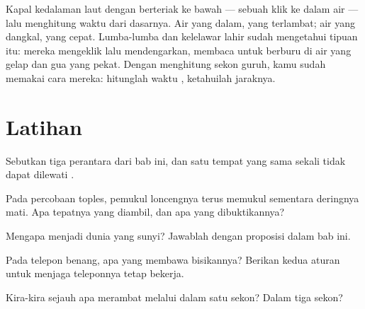 \begin{remark}\label{rem:g4:how-sound-travels:sonar}
Kapal  kedalaman laut dengan berteriak ke bawah --- sebuah
klik ke dalam air --- lalu menghitung waktu  dari dasarnya. Air
yang dalam,  yang terlambat; air yang dangkal,  yang cepat.
Lumba-lumba dan kelelawar lahir sudah mengetahui tipuan itu: mereka
mengeklik lalu mendengarkan, membaca  untuk berburu di air yang
gelap dan gua yang pekat. Dengan menghitung sekon guruh, kamu sudah
memakai cara mereka: hitunglah waktu , ketahuilah jaraknya.
\end{remark}

\section{Latihan}

\begin{exercise}[$\star$]\label{exo:g4:how-sound-travels:1}
Sebutkan tiga perantara  dari bab ini, dan satu tempat yang sama
sekali tidak dapat dilewati .
\end{exercise}

\begin{exercise}[$\star$]\label{exo:g4:how-sound-travels:2}
Pada percobaan toples, pemukul loncengnya terus memukul sementara
deringnya mati. Apa tepatnya yang diambil, dan apa yang dibuktikannya?
\end{exercise}

\begin{exercise}[$\star$]\label{exo:g4:how-sound-travels:3}
Mengapa  menjadi dunia yang sunyi? Jawablah dengan proposisi
dalam bab ini.
\end{exercise}

\begin{exercise}[$\star$]\label{exo:g4:how-sound-travels:4}
Pada telepon benang, apa yang membawa bisikannya? Berikan kedua aturan
untuk menjaga teleponnya tetap bekerja.
\end{exercise}

\begin{exercise}[$\star$]\label{exo:g4:how-sound-travels:5}
Kira-kira sejauh apa  merambat melalui  dalam satu sekon?
Dalam tiga sekon?
\end{exercise}

